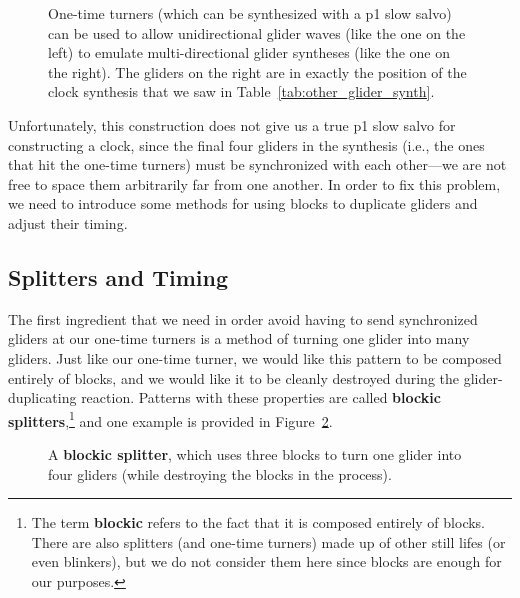 \begin{figure}[!htb]
	\centering{}
	\caption{One-time turners (which can be synthesized with a p1 slow salvo) can be used to allow unidirectional glider waves (like the one on the left) to emulate multi-directional glider syntheses (like the one on the right). The gliders on the right are in exactly the position of the clock synthesis that we saw in Table~\ref{tab:other_glider_synth}.}\label{fig:unidirection_clock_synthesis}
\end{figure}


\clearpage%


Unfortunately, this construction does not give us a true p1 slow salvo for constructing a clock, since the final four gliders in the synthesis (i.e., the ones that hit the one-time turners) must be synchronized with each other---we are not free to space them arbitrarily far from one another. In order to fix this problem, we need to introduce some methods for using blocks to duplicate gliders and adjust their timing.


\subsection{Splitters and Timing}\label{sec:slow_salvo_splitters}

The first ingredient that we need in order avoid having to send synchronized gliders at our one-time turners is a method of turning one glider into many gliders. Just like our one-time turner, we would like this pattern to be composed entirely of blocks, and we would like it to be cleanly destroyed during the glider-duplicating reaction. Patterns with these properties are called \textbf{blockic splitters},\footnote{The term \textbf{blockic} refers to the fact that it is composed entirely of blocks. There are also splitters (and one-time turners) made up of other still lifes (or even blinkers), but we do not consider them here since blocks are enough for our purposes.} and one example is provided in Figure~\ref{fig:one_time_splitter}.

\begin{figure}[!htb]
	\centering{}
	\caption{A \textbf{blockic splitter}, which uses three blocks to turn one glider into four gliders (while destroying the blocks in the process).}\label{fig:one_time_splitter}
\end{figure}

